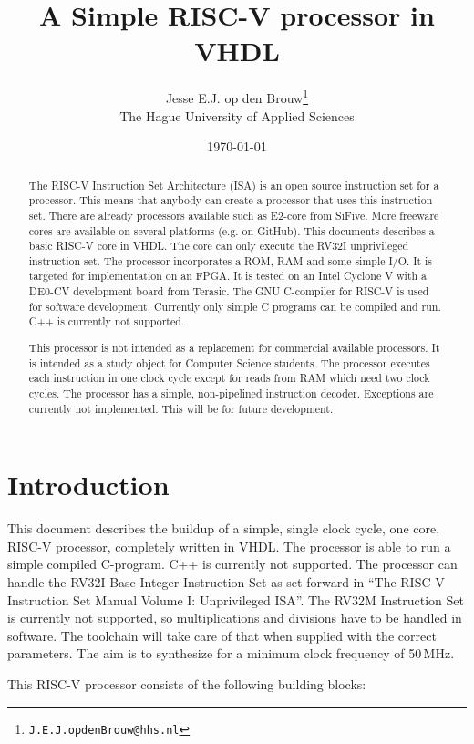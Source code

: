\documentclass[12pt]{article}
\author{Jesse E.J. op den Brouw\thanks{\texttt{J.E.J.opdenBrouw@hhs.nl}}\\[2ex]The Hague University of Applied Sciences}
\title{A Simple RISC-V processor in VHDL}
\date{\today}
\begin{document}
\maketitle

\vfill
\begin{abstract}
\noindent
The RISC-V Instruction Set Architecture (ISA) is an open source instruction set for a processor. This means that anybody can create a processor that uses this instruction set. There are already processors available such as E2-core from SiFive. More freeware cores are available on several platforms (e.g. on GitHub). This documents describes a basic RISC-V core in VHDL. The core can only execute the RV32I unprivileged instruction set. The processor incorporates a ROM, RAM and some simple I/O. It is targeted for implementation on an FPGA. It is tested on an Intel Cyclone V with a DE0-CV development board from Terasic. The GNU C-compiler for RISC-V is used for software development. Currently only simple C programs can be compiled and run. C++ is currently not supported.

\noindent
This processor is not intended as a replacement for commercial available processors. It is intended as a study object for Computer Science students. The processor executes each instruction in one clock cycle except for reads from RAM which need two clock cycles. The processor has a simple, non-pipelined instruction decoder. Exceptions are currently not implemented. This will be for future development.

\end{abstract}
\vfill

\clearpage
\section{Introduction}
This document describes the buildup of a simple, single clock cycle, one core, RISC-V processor, completely written in VHDL. The processor is able to run a simple compiled C-program. C++ is currently not supported. The processor can handle the RV32I Base Integer Instruction Set as set forward in ``The RISC-V Instruction Set Manual Volume I: Unprivileged ISA''. The RV32M Instruction Set is currently not supported, so multiplications and divisions have to be handled in software. The toolchain will take care of that when supplied with the correct parameters. The aim is to synthesize for a minimum clock frequency of 50\,MHz.

This RISC-V processor consists of the following building blocks:
\end{document}
